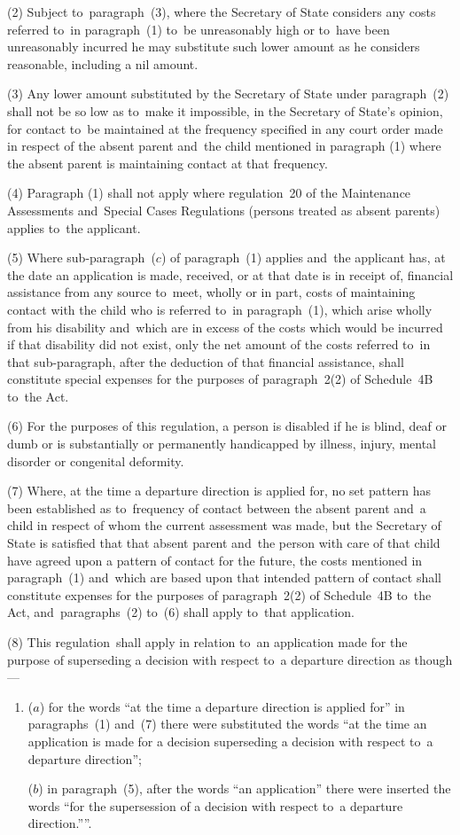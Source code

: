 \documentclass[12pt,a4paper]{article}
\begin{document}
(2) Subject to~paragraph~(3), where the Secretary of State considers any costs
referred to~in paragraph~(1) to~be unreasonably high or to~have been
unreasonably incurred he may substitute such lower amount as he considers
reasonable, including a nil amount.

(3) Any lower amount substituted by the Secretary of State under paragraph~(2)
shall not be so low as to~make it impossible, in the Secretary of State’s
opinion, for contact to~be maintained at the frequency specified in any court
order made in respect of the absent parent and~the child mentioned in paragraph
(1) where the absent parent is maintaining contact at that frequency.

(4) Paragraph (1) shall not apply where regulation~20 of the Maintenance
Assessments and~Special Cases Regulations (persons treated as absent parents)
applies to~the applicant.

(5) Where sub-paragraph~($c$) of paragraph~(1) applies and~the applicant has, at
the date an application is made, received, or at that date is in receipt of,
financial assistance from any source to~meet, wholly or in part, costs of
maintaining contact with the child who is referred to~in paragraph~(1), which
arise wholly from his disability and~which are in excess of the costs which
would be incurred if that disability did not exist, only the net amount of the
costs referred to~in that sub-paragraph, after the deduction of that financial
assistance, shall constitute special expenses for the purposes of paragraph~2(2)
of Schedule~4B to~the Act.

(6) For the purposes of this regulation, a person is disabled if he is blind,
deaf or dumb or is substantially or permanently handicapped by illness, injury,
mental disorder or congenital deformity.

(7) Where, at the time a departure direction is applied for, no set pattern has
been established as to~frequency of contact between the absent parent and~a
child in respect of whom the current assessment was made, but the Secretary of
State is satisfied that that absent parent and~the person with care of that
child have agreed upon a pattern of contact for the future, the costs mentioned
in paragraph~(1) and~which are based upon that intended pattern of contact shall
constitute expenses for the purposes of paragraph~2(2) of Schedule~4B to~the
Act, and~paragraphs~(2) to~(6) shall apply to~that application.

(8) This regulation~shall apply in relation to~an application made for the purpose of superseding a decision with respect to~a departure direction as though---
\begin{enumerate}\item[]
($a$) for the words “at the time a departure direction is applied for” in paragraphs~(1) and~(7) there were substituted the words “at the time an application is made for a decision superseding a decision with respect to~a departure direction”;

($b$) in paragraph~(5), after the words “an application” there were inserted the words “for the supersession of a decision with respect to~a departure direction.””.
\end{enumerate}
\end{document}
